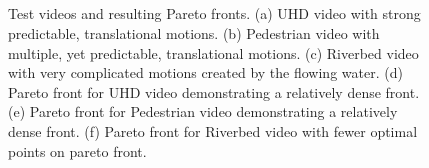\documentclass{book}
\begin{document}
\begin{figure}[bh!]
{		\label{fig:Bovik2}} 
	\\		
	 \\
	 \\
	 \\		
	
	\caption{ Test videos and resulting Pareto fronts. 
		(a) UHD video with strong predictable, translational motions. 
		(b) Pedestrian video with multiple, yet predictable, translational motions.
		(c) Riverbed video with very complicated motions created by the flowing water.
		(d) Pareto front for UHD video demonstrating a relatively dense front.
		(e) Pareto front for Pedestrian video demonstrating a relatively dense front.  (f) Pareto front for Riverbed video with fewer optimal points on pareto front.}
	\label{fig1:setup}                 
\end{figure}






%
%
\end{document}
